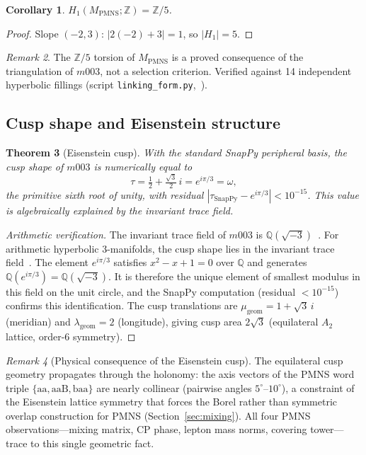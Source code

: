 \documentclass[11pt,a4paper]{article}
\newtheorem{theorem}{Theorem}
\newtheorem{corollary}[theorem]{Corollary}
\theoremstyle{definition}
\theoremstyle{remark}
\newtheorem{remark}[theorem]{Remark}
\newcommand{\ZZ}{\mathbb{Z}}
\newcommand{\QQ}{\mathbb{Q}}
\newcommand{\MPMNS}{M_{\mathrm{PMNS}}}
\begin{document}
\begin{corollary}
\label{cor:h1}
$H_1(\MPMNS;\ZZ) = \ZZ/5$.
\end{corollary}
\begin{proof}
Slope $(-2,3)$: $|2(-2)+3| = 1$, so $|H_1| = 5$.
\end{proof}

\begin{remark}
The $\ZZ/5$ torsion of $\MPMNS$ is a proved consequence of
the triangulation of $m003$, not a selection criterion.
Verified against 14 independent hyperbolic fillings
(script \texttt{linking\_form.py},~\cite{GitHub}).
\end{remark}

\subsection{Cusp shape and Eisenstein structure}

\begin{theorem}[Eisenstein cusp]
\label{thm:cusp}
With the standard SnapPy peripheral basis,
the cusp shape of $m003$ is numerically equal to
\[
  \tau = \tfrac{1}{2}+\tfrac{\sqrt{3}}{2}\,i
       = e^{i\pi/3} = \omega,
\]
the primitive sixth root of unity, with residual
$|\tau_{\mathrm{SnapPy}} - e^{i\pi/3}| < 10^{-15}$.
This value is algebraically explained by the invariant trace field.
\end{theorem}

\begin{proof}[Arithmetic verification]
The invariant trace field of $m003$ is $\QQ(\sqrt{-3})$~\cite{Chinburg98}.
For arithmetic hyperbolic 3-manifolds, the cusp shape lies in the
invariant trace field~\cite{MaclachlanReid}.
The element $e^{i\pi/3}$ satisfies $x^2-x+1=0$ over $\QQ$
and generates $\QQ(e^{i\pi/3}) = \QQ(\sqrt{-3})$.
It is therefore the unique element of smallest modulus in this
field on the unit circle, and the SnapPy computation
(residual $< 10^{-15}$) confirms this identification.
The cusp translations are $\mu_{\mathrm{geom}} = 1+\sqrt{3}\,i$
(meridian) and $\lambda_{\mathrm{geom}} = 2$ (longitude),
giving cusp area $2\sqrt{3}$ (equilateral $A_2$ lattice,
order-6 symmetry).
\end{proof}

\begin{remark}[Physical consequence of the Eisenstein cusp]
The equilateral cusp geometry propagates through the holonomy:
the axis vectors of the PMNS word triple
$\{\mathrm{aa},\mathrm{aaB},\mathrm{baa}\}$ are nearly collinear
(pairwise angles $5^\circ$--$10^\circ$), a constraint of the
Eisenstein lattice symmetry that forces the Borel rather than
symmetric overlap construction for PMNS
(Section~\ref{sec:mixing}).
All four PMNS observations---mixing matrix, CP phase, lepton
mass norms, covering tower---trace to this single geometric fact.
\end{remark}
\end{document}
